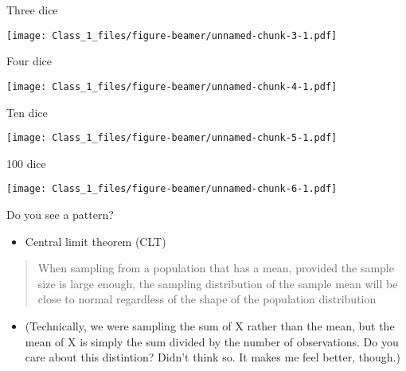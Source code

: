 \begin{frame}{Three dice}

\texttt{[image: Class\_1\_files/figure-beamer/unnamed-chunk-3-1.pdf]}

\end{frame}

\begin{frame}{Four dice}

\texttt{[image: Class\_1\_files/figure-beamer/unnamed-chunk-4-1.pdf]}

\end{frame}

\begin{frame}{Ten dice}

\texttt{[image: Class\_1\_files/figure-beamer/unnamed-chunk-5-1.pdf]}

\end{frame}

\begin{frame}{100 dice}

\texttt{[image: Class\_1\_files/figure-beamer/unnamed-chunk-6-1.pdf]}

\end{frame}

\begin{frame}{Do you see a pattern?}

\begin{itemize}
\itemsep1pt\parskip0pt
\item
  Central limit theorem (CLT)
\end{itemize}

\begin{quote}
When sampling from a population that has a mean, provided the sample
size is large enough, the sampling distribution of the sample mean will
be close to normal regardless of the shape of the population
distribution
\end{quote}

\begin{itemize}
\itemsep1pt\parskip0pt
\item
  (Technically, we were sampling the sum of X rather than the mean, but
  the mean of X is simply the sum divided by the number of observations.
  Do you care about this distintion? Didn't think so. It makes me feel
  better, though.)
\end{itemize}

\end{frame}

